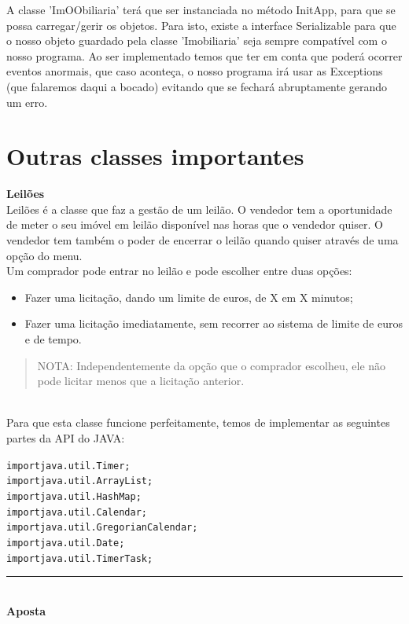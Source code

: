 \documentclass[12pt]{article}
\newenvironment{code}                    
{\textbf{
} \hspace{1cm} \hrulefill \\ 
\smallskip 
\begin{center}
\begin{minipage}{0.9\textwidth} 
\begin{alltt}\small}
{\end{alltt}
\end{minipage}
\end{center}
\hrule\smallskip
}
\begin{document}
A classe 'ImOObiliaria' terá que ser instanciada no método
InitApp, para que se possa carregar/gerir os objetos.
Para isto, existe a interface Serializable para que o nosso objeto guardado pela classe 'Imobiliaria'
seja sempre compatível com o nosso programa. Ao ser implementado temos que ter em conta
que poderá ocorrer eventos anormais, que caso aconteça, o nosso programa irá usar as Exceptions (que falaremos daqui a bocado)
evitando que se fechará abruptamente gerando um erro. 
~\\

\pagebreak
\section{Outras classes importantes}

\textbf{Leilões}
\newline
~\\

Leilões é a classe que faz a gestão de um leilão. O vendedor tem a oportunidade de meter o seu imóvel em leilão disponível nas horas que o vendedor quiser. O vendedor tem também o poder de encerrar o leilão quando quiser através de uma opção do menu.
~\\

Um comprador pode entrar no leilão e pode escolher entre duas opções:
\begin{itemize}
\item Fazer uma licitação, dando um limite de euros, de X em X minutos; 
\item Fazer uma licitação imediatamente, sem recorrer ao sistema de limite de euros e de tempo.
\end{itemize}
\begin{quote}
NOTA: Independentemente da opção que o comprador escolheu, ele não pode licitar menos que a licitação anterior.
\end{quote}
~\\

Para que esta classe funcione perfeitamente, temos de implementar as seguintes partes da API do JAVA:
\newline
\begin{code}
import java.util.Timer;
import java.util.ArrayList;
import java.util.HashMap;
import java.util.Calendar;
import java.util.GregorianCalendar;
import java.util.Date;
import java.util.TimerTask;
\end{code}
~\\

\textbf{Aposta}
\newline
~\\
\end{document}
